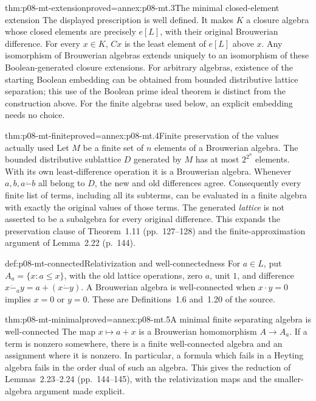 \begin{hbtheorem}{thm:p08-mt-extension}{proved=annex:p08-mt.3}{The minimal closed-element extension}
The displayed prescription is well defined. It makes \(K\) a closure
algebra whose closed elements are precisely \(e[L]\), with their original
Brouwerian difference. For every \(x\in K\), \(Cx\) is the least element
of \(e[L]\) above \(x\). Any isomorphism of Brouwerian algebras extends
uniquely to an isomorphism of these Boolean-generated closure extensions.
For arbitrary algebras, existence of the starting Boolean embedding can
be obtained from bounded distributive lattice separation; this use of
the Boolean prime ideal theorem is distinct from the construction above.
For the finite algebras used below, an explicit embedding needs no choice.
\end{hbtheorem}

\begin{hblemma}{thm:p08-mt-finite}{proved=annex:p08-mt.4}{Finite preservation of the values actually used}
Let \(M\) be a finite set of \(n\) elements of a Brouwerian algebra.
The bounded distributive sublattice \(D\) generated by \(M\) has at most
\(2^{2^n}\) elements. With its own least-difference operation it is a
Brouwerian algebra. Whenever \(a,b,a\mathbin{\dot{-}}b\) all belong to
\(D\), the new and old differences agree.
Consequently every finite list of terms, including all its subterms, can
be evaluated in a finite algebra with exactly the original values of
those terms. The generated \emph{lattice} is not asserted to be a
subalgebra for every original difference.
This expands the preservation clause of Theorem~1.11 (pp.~127--128) and
the finite-approximation argument of Lemma~2.22 (p.~144).
\end{hblemma}

\begin{hbdefinition}{def:p08-mt-connected}{Relativization and well-connectedness}
For \(a\in L\), put \(A_a=\{x:a\leq x\}\), with the old lattice
operations, zero \(a\), unit \(1\), and difference
\(x\mathbin{\dot{-}}_a y=a+(x\mathbin{\dot{-}}y)\).
A Brouwerian algebra is well-connected when
\(x\cdot y=0\) implies \(x=0\) or \(y=0\).
These are Definitions~1.6 and~1.20 of the source.
\end{hbdefinition}

\begin{hblemma}{thm:p08-mt-minimal}{proved=annex:p08-mt.5}{A minimal finite separating algebra is well-connected}
The map \(x\mapsto a+x\) is a Brouwerian homomorphism \(A\to A_a\).
If a term is nonzero somewhere, there is a finite well-connected algebra
and an assignment where it is nonzero. In particular, a formula which
fails in a Heyting algebra fails in the order dual of such an algebra.
This gives the reduction of Lemmas~2.23--2.24 (pp.~144--145), with the
relativization maps and the smaller-algebra argument made explicit.
\end{hblemma}

